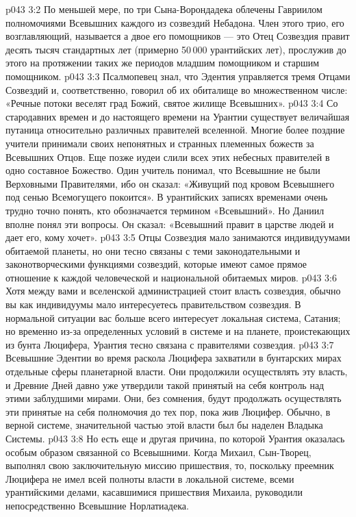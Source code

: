 \vs p043 3:2 \pc По меньшей мере, по три Сына\hyp{}Ворондадека облечены Гавриилом полномочиями Всевышних каждого из созвездий Небадона. Член этого трио, его возглавляющий, называется  а двое его помощников --- это  Отец Созвездия правит десять тысяч стандартных лет (примерно 50\,000 урантийских лет), прослужив до этого на протяжении таких же периодов младшим помощником и старшим помощником.
\vs p043 3:3 Псалмопевец знал, что Эдентия управляется тремя Отцами Созвездий и, соответственно, говорил об их обиталище во множественном числе: «Речные потоки веселят град Божий, святое жилище Всевышних».
\vs p043 3:4 \pc Со стародавних времен и до настоящего времени на Урантии существует величайшая путаница относительно различных правителей вселенной. Многие более поздние учители принимали своих непонятных и странных племенных божеств за Всевышних Отцов. Еще позже иудеи слили всех этих небесных правителей в одно составное Божество. Один учитель понимал, что Всевышние не были Верховными Правителями, ибо он сказал: «Живущий под кровом Всевышнего под сенью Всемогущего покоится». В урантийских записях временами очень трудно точно понять, кто обозначается термином «Всевышний». Но Даниил вполне понял эти вопросы. Он сказал: «Всевышний правит в царстве людей и дает его, кому хочет».
\vs p043 3:5 \pc Отцы Созвездия мало занимаются индивидуумами обитаемой планеты, но они тесно связаны с теми законодательными и законотворческими функциями созвездий, которые имеют самое прямое отношение к каждой человеческой  и национальной  обитаемых миров.
\vs p043 3:6 Хотя между вами и вселенской администрацией стоит власть созвездия, обычно вы как индивидуумы мало интересуетесь правительством созвездия. В нормальной ситуации вас больше всего интересует локальная система, Сатания; но временно из\hyp{}за определенных условий в системе и на планете, проистекающих из бунта Люцифера, Урантия тесно связана с правителями созвездия.
\vs p043 3:7 Всевышние Эдентии во время раскола Люцифера захватили в бунтарских мирах отдельные сферы планетарной власти. Они продолжили осуществлять эту власть, и Древние Дней давно уже утвердили такой принятый на себя контроль над этими заблудшими мирами. Они, без сомнения, будут продолжать осуществлять эти принятые на себя полномочия до тех пор, пока жив Люцифер. Обычно, в верной системе, значительной частью этой власти был бы наделен Владыка Системы.
\vs p043 3:8 Но есть еще и другая причина, по которой Урантия оказалась особым образом связанной со Всевышними. Когда Михаил, Сын\hyp{}Творец, выполнял свою заключительную миссию пришествия, то, поскольку преемник Люцифера не имел всей полноты власти в локальной системе, всеми урантийскими делами, касавшимися пришествия Михаила, руководили непосредственно Всевышние Норлатиадека.
